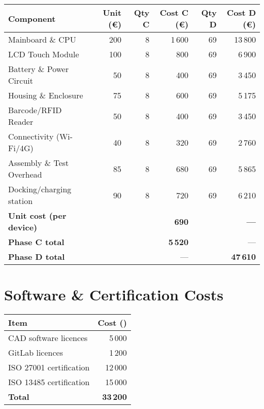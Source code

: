 \documentclass[a4paper,11pt]{article}
\begin{document}
\begin{tabularx}{\textwidth}{Xrrrrr}
\toprule
\textbf{Component}           & \textbf{Unit (€)} & \textbf{Qty C} & \textbf{Cost C (€)} & \textbf{Qty D} & \textbf{Cost D (€)} \\
\midrule
Mainboard \& CPU             & 200               & 8              & 1\,600               & 69             & 13\,800              \\
LCD Touch Module             & 100               & 8              &   800                & 69             &  6\,900              \\
Battery \& Power Circuit     &  50               & 8              &   400                & 69             &  3\,450              \\
Housing \& Enclosure         &  75               & 8              &   600                & 69             &  5\,175              \\
Barcode/RFID Reader          &  50               & 8              &   400                & 69             &  3\,450              \\
Connectivity (Wi-Fi/4G)      &  40               & 8              &   320                & 69             &  2\,760              \\
Assembly \& Test Overhead    &  85               & 8              &   680                & 69             &  5\,865 \\
Docking/charging station     &  90               & 8              &   720                & 69             &  6\,210 \\
\midrule
\textbf{Unit cost (per device)} &           &                & \textbf{690}         &                & \textbf{—}          \\
\textbf{Phase C total}       &                   &                & \textbf{5\,520}      &                & —                    \\
\textbf{Phase D total}       &                   &                & —                    &                & \textbf{47\,610}     \\
\bottomrule
\end{tabularx}

\section*{Software \& Certification Costs}
\begin{tabularx}{\textwidth}{Xr}
\toprule
\textbf{Item} & \textbf{Cost (\texteuro{})} \\
\midrule
CAD software licences & 5\,000 \\
GitLab licences & 1\,200 \\
ISO 27001 certification & 12\,000 \\
ISO 13485 certification & 15\,000 \\
\midrule
\textbf{Total} & \textbf{33\,200} \\
\bottomrule
\end{tabularx}
\end{document}
